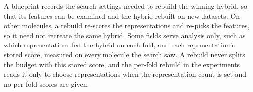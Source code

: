 A blueprint records the search settings needed to rebuild the winning hybrid, so that its features can be examined and the hybrid rebuilt on new datasets. On other molecules, a rebuild re-scores the representations and re-picks the features, so it need not recreate the same hybrid. Some fields serve analysis only, such as which representations fed the hybrid on each fold, and each representation's stored score, measured on every molecule the search saw. A rebuild never splits the budget with this stored score, and the per-fold rebuild in the experiments reads it only to choose representations when the representation count is set and no per-fold scores are given.

